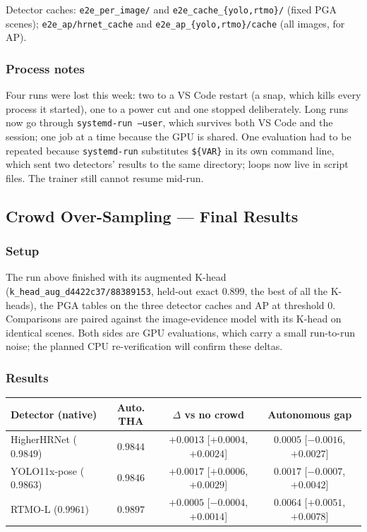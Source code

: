 \vspace{0.5em}

Detector caches: \texttt{e2e\_per\_image/} and \texttt{e2e\_cache\_\{yolo,rtmo\}/} (fixed PGA scenes); \texttt{e2e\_ap/hrnet\_cache} and \texttt{e2e\_ap\_\{yolo,rtmo\}/cache} (all images, for AP).

\subsubsection{Process notes}

Four runs were lost this week: two to a VS Code restart (a snap, which kills every process it started), one to a power cut and one stopped deliberately. Long runs now go through \texttt{systemd-run --user}, which survives both VS Code and the session; one job at a time because the GPU is shared. One evaluation had to be repeated because \texttt{systemd-run} substitutes \texttt{\$\{VAR\}} in its own command line, which sent two detectors' results to the same directory; loops now live in script files. The trainer still cannot resume mid-run.

\subsection{Crowd Over-Sampling --- Final Results}

\subsubsection{Setup}

The run above finished with its augmented K-head (\texttt{k\_head\_aug\_d4422c37/88389153}, held-out exact $0.899$, the best of all the K-heads), the PGA tables on the three detector caches and AP at threshold 0. Comparisons are paired against the image-evidence model with its K-head on identical scenes. Both sides are GPU evaluations, which carry a small run-to-run noise; the planned CPU re-verification will confirm these deltas.

\subsubsection{Results}

{\small
\begin{tabular}{lccc}
\hline
\textbf{Detector (native)} & \textbf{Auto. THA} & \textbf{$\Delta$ vs no crowd} & \textbf{Autonomous gap} \\
\hline
HigherHRNet ($0.9849$)  & $\mathbf{0.9844}$ & $+0.0013$ [$+0.0004$, $+0.0024$] & $0.0005$ [$-0.0016$, $+0.0027$] \\
YOLO11x-pose ($0.9863$) & $\mathbf{0.9846}$ & $+0.0017$ [$+0.0006$, $+0.0029$] & $0.0017$ [$-0.0007$, $+0.0042$] \\
RTMO-L ($0.9961$)       & $0.9897$ & $+0.0005$ [$-0.0004$, $+0.0014$] & $0.0064$ [$+0.0051$, $+0.0078$] \\
\hline
\end{tabular}
}

